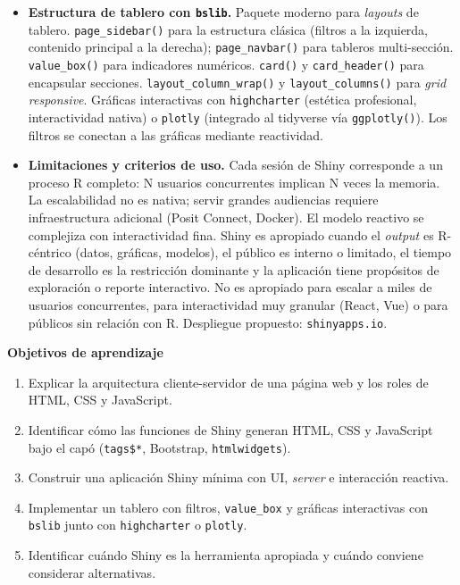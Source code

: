 \documentclass[11pt,letterpaper]{article}
\begin{document}
\begin{itemize}[leftmargin=*, itemsep=2pt]
    \item \textbf{Estructura de tablero con \texttt{bslib}.} Paquete moderno para \textit{layouts} de tablero. \texttt{page\_sidebar()} para la estructura clásica (filtros a la izquierda, contenido principal a la derecha); \texttt{page\_navbar()} para tableros multi-sección. \texttt{value\_box()} para indicadores numéricos. \texttt{card()} y \texttt{card\_header()} para encapsular secciones. \texttt{layout\_column\_wrap()} y \texttt{layout\_columns()} para \textit{grid responsive}. Gráficas interactivas con \texttt{highcharter} (estética profesional, interactividad nativa) o \texttt{plotly} (integrado al tidyverse vía \texttt{ggplotly()}). Los filtros se conectan a las gráficas mediante reactividad.
    \item \textbf{Limitaciones y criterios de uso.} Cada sesión de Shiny corresponde a un proceso R completo: N usuarios concurrentes implican N veces la memoria. La escalabilidad no es nativa; servir grandes audiencias requiere infraestructura adicional (Posit Connect, Docker). El modelo reactivo se complejiza con interactividad fina. Shiny es apropiado cuando el \textit{output} es R-céntrico (datos, gráficas, modelos), el público es interno o limitado, el tiempo de desarrollo es la restricción dominante y la aplicación tiene propósitos de exploración o reporte interactivo. No es apropiado para escalar a miles de usuarios concurrentes, para interactividad muy granular (React, Vue) o para públicos sin relación con R. Despliegue propuesto: \texttt{shinyapps.io}.
\end{itemize}

\medskip
\noindent\textbf{Objetivos de aprendizaje}
\begin{enumerate}[leftmargin=*, itemsep=1pt]
    \item Explicar la arquitectura cliente-servidor de una página web y los roles de HTML, CSS y JavaScript.
    \item Identificar cómo las funciones de Shiny generan HTML, CSS y JavaScript bajo el capó (\texttt{tags\$*}, Bootstrap, \texttt{htmlwidgets}).
    \item Construir una aplicación Shiny mínima con UI, \textit{server} e interacción reactiva.
    \item Implementar un tablero con filtros, \texttt{value\_box} y gráficas interactivas con \texttt{bslib} junto con \texttt{highcharter} o \texttt{plotly}.
    \item Identificar cuándo Shiny es la herramienta apropiada y cuándo conviene considerar alternativas.
\end{enumerate}
\end{document}
